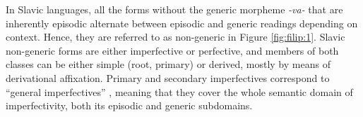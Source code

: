 \documentclass[output=paper,colorlinks,citecolor=brown]{langscibook}
\begin{document}

In Slavic languages, all the forms without the generic morpheme \textit{-va-} that are inherently episodic alternate between episodic and generic readings depending on context.
Hence, they are referred to as non-generic in 
Figure \ref{fig:filip:1}.
Slavic non-generic forms are either imperfective or perfective, and members of both classes can be either simple (root, primary) or derived, mostly by means of derivational affixation. Primary and secondary imperfectives
correspond to ``general imperfectives'' \citep{Comrie1976}, meaning that they
cover the whole semantic domain of imperfectivity,
both its episodic and generic subdomains. 
\end{document}
